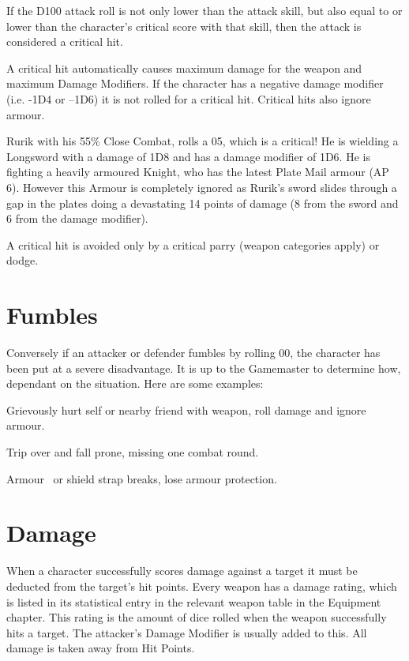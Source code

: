 If the D100 attack roll is not only lower than the attack skill, but also equal to or lower than the character’s critical score with that skill, then the attack is considered a critical hit. 

A critical hit automatically causes maximum damage for the weapon and maximum Damage Modifiers. If the character has a negative damage modifier (i.e. -1D4 or –1D6) it is not rolled for a critical hit. Critical hits also ignore armour.

\begin{rpg-examplebox}
 Rurik with his 55\% Close Combat, rolls a 05, which is a critical! He is wielding a Longsword with a damage of 1D8 and has a damage modifier of 1D6. He is fighting a heavily armoured Knight, who has the latest Plate Mail armour (AP 6). However this Armour is completely ignored as Rurik’s sword slides through a gap in the plates doing a devastating 14 points of damage (8 from the sword and 6 from the damage modifier).
\end{rpg-examplebox}

A critical hit is avoided only by a critical parry (weapon categories apply) or dodge.



\section{Fumbles}
Conversely if an attacker or defender fumbles by rolling 00, the character has been put at a severe disadvantage. It is up to the Gamemaster to determine how, dependant on the situation. Here are some examples:
\begin{rpg-list}
	\item Grievously hurt self or nearby friend with weapon, roll damage and ignore armour.
	\item Trip over and fall prone, missing one combat round.
	\item Armour  or shield strap breaks, lose armour protection.
\end{rpg-list}



\section{Damage}
When a character successfully scores damage against a target it must be deducted from the target’s hit points. Every weapon has a damage rating, which is listed in its statistical entry in the relevant weapon table in the Equipment chapter. This rating is the amount of dice rolled when the weapon successfully hits a target. The attacker’s Damage Modifier is usually added to this. All damage is taken away from Hit Points. 

